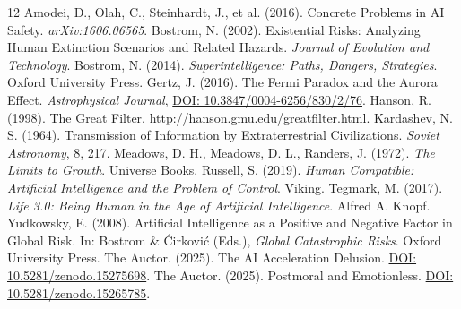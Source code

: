 \documentclass[12pt,a4paper]{article}
\begin{document}

\begin{thebibliography}{12}
 Amodei, D., Olah, C., Steinhardt, J., et al. (2016). Concrete Problems in AI Safety. \emph{arXiv:1606.06565}.
 Bostrom, N. (2002). Existential Risks: Analyzing Human Extinction Scenarios and Related Hazards. \emph{Journal of Evolution and Technology}.
 Bostrom, N. (2014). \emph{Superintelligence: Paths, Dangers, Strategies}. Oxford University Press.
 Gertz, J. (2016). The Fermi Paradox and the Aurora Effect. \emph{Astrophysical Journal}, \href{https://doi.org/10.3847/0004-6256/830/2/76}{DOI: 10.3847/0004-6256/830/2/76}.
 Hanson, R. (1998). The Great Filter. \url{http://hanson.gmu.edu/greatfilter.html}.
 Kardashev, N. S. (1964). Transmission of Information by Extraterrestrial Civilizations. \emph{Soviet Astronomy}, 8, 217.
 Meadows, D. H., Meadows, D. L., Randers, J. (1972). \emph{The Limits to Growth}. Universe Books.
 Russell, S. (2019). \emph{Human Compatible: Artificial Intelligence and the Problem of Control}. Viking.
 Tegmark, M. (2017). \emph{Life 3.0: Being Human in the Age of Artificial Intelligence}. Alfred A. Knopf.
 Yudkowsky, E. (2008). Artificial Intelligence as a Positive and Negative Factor in Global Risk. In: Bostrom \& Ćirković (Eds.), \emph{Global Catastrophic Risks}. Oxford University Press.
 The Auctor. (2025). The AI Acceleration Delusion. \href{https://doi.org/10.5281/zenodo.15275698}{DOI: 10.5281/zenodo.15275698}.
 The Auctor. (2025). Postmoral and Emotionless. \href{https://doi.org/10.5281/zenodo.15265785}{DOI: 10.5281/zenodo.15265785}.
\end{thebibliography}
\end{document}
